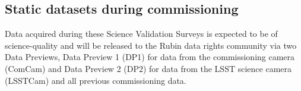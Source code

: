 \subsection{Static datasets during commissioning}

Data acquired during these Science Validation Surveys is expected to be of science-quality and will be released to the Rubin data rights community via two Data Previews, Data Preview 1 (DP1) for data from the commissioning camera (ComCam) and Data Preview 2 (DP2) for data from the LSST science camera (LSSTCam) and all previous commissioning data. 

